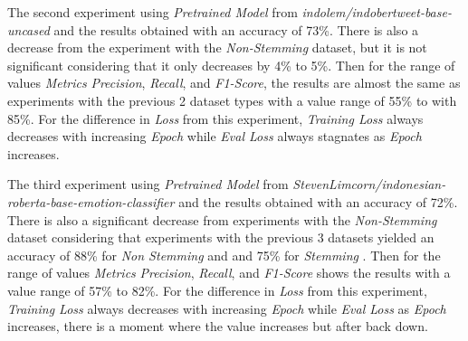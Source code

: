 The second experiment using \textit{Pretrained Model} from \textit{indolem/indobertweet-base-uncased} and the results obtained with an accuracy of 73\%. There is also a decrease from the experiment with the \textit{Non-Stemming} dataset, but it is not significant considering that it only decreases by 4\% to 5\%. Then for the range of values \textit{Metrics} \textit{Precision}, \textit{Recall}, and \textit{F1-Score}, the results are almost the same as experiments with the previous 2 dataset types with a value range of 55\% to with 85\%. For the difference in \textit{Loss} from this experiment, \textit{Training Loss} always decreases with increasing \textit{Epoch} while \textit{Eval Loss} always stagnates as \textit{Epoch} increases.

The third experiment using \textit{Pretrained Model} from \textit{StevenLimcorn/indonesian-roberta-base-emotion-classifier} and the results obtained with an accuracy of 72\%. There is also a significant decrease from experiments with the \textit{Non-Stemming} dataset considering that experiments with the previous 3 datasets yielded an accuracy of 88\% for \textit{Non Stemming} and and 75\% for \textit{Stemming} . Then for the range of values \textit{Metrics} \textit{Precision}, \textit{Recall}, and \textit{F1-Score} shows the results with a value range of 57\% to 82\%. For the difference in \textit{Loss} from this experiment, \textit{Training Loss} always decreases with increasing \textit{Epoch} while \textit{Eval Loss} as \textit{Epoch} increases, there is a moment where the value increases but after back down.